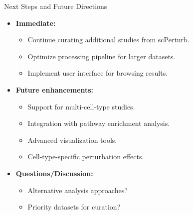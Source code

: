\documentclass[handout]{beamer}
\begin{document}
\begin{frame}{Next Steps and Future Directions}
    \begin{itemize}
        \item \textbf{Immediate:}
        \begin{itemize}
            \item Continue curating additional studies from scPerturb.
            \item Optimize processing pipeline for larger datasets.
            \item Implement user interface for browsing results.
        \end{itemize}
        \item \textbf{Future enhancements:}
        \begin{itemize}
            \item Support for multi-cell-type studies.
            \item Integration with pathway enrichment analysis.
            \item Advanced visualization tools.
            \item Cell-type-specific perturbation effects.
        \end{itemize}
        \item \textbf{Questions/Discussion:}
        \begin{itemize}
            \item Alternative analysis approaches?
            \item Priority datasets for curation?
        \end{itemize}
    \end{itemize}
\end{frame}
\end{document}
